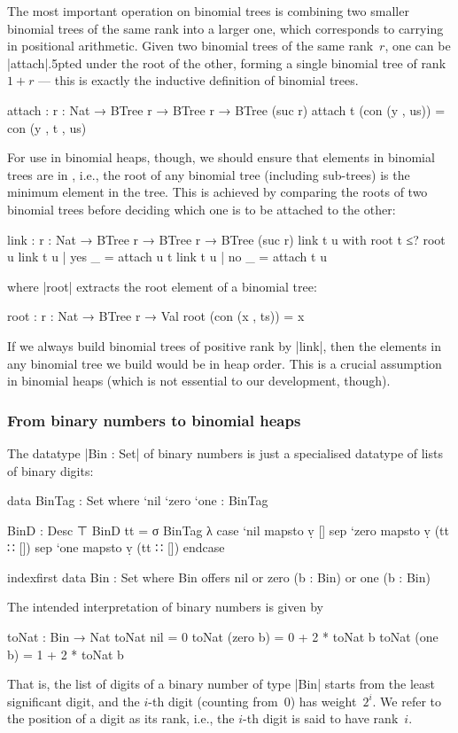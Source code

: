 The most important operation on binomial trees is combining two smaller binomial trees of the same rank into a larger one, which corresponds to carrying in positional arithmetic.
Given two binomial trees of the same rank~$r$, one can be |attach|{\kern.5pt}ed under the root of the other, forming a single binomial tree of rank $1+r$ --- this is exactly the inductive definition of binomial trees.
\begin{code}
attach : {r : Nat} → BTree r → BTree r → BTree (suc r)
attach t (con (y , us)) = con (y , t , us)
\end{code}
For use in binomial heaps, though, we should ensure that elements in binomial trees are in , i.e., the root of any binomial tree (including sub-trees) is the minimum element in the tree.
This is achieved by comparing the roots of two binomial trees before deciding which one is to be attached to the other:
\begin{code}
link : {r : Nat} → BTree r → BTree r → BTree (suc r)
link t u with root t ≤? root u
link t u | yes  _ = attach u t
link t u | no   _ = attach t u
\end{code}
where |root| extracts the root element of a binomial tree:
\begin{code}
root : {r : Nat} → BTree r → Val
root (con (x , ts)) = x
\end{code}
If we always build binomial trees of positive rank by |link|, then the elements in any binomial tree we build would be in heap order.
This is a crucial assumption in binomial heaps (which is not essential to our development, though).

\subsubsection{From binary numbers to binomial heaps}
The datatype |Bin : Set| of binary numbers is just a specialised datatype of lists of binary digits:
\begin{code}
data BinTag : Set where `nil `zero `one : BinTag

BinD : Desc ⊤
BinD tt = σ BinTag λ  case  `nil   mapsto  ṿ []
                      sep   `zero  mapsto  ṿ (tt ∷ [])
                      sep   `one   mapsto  ṿ (tt ∷ []) endcase

indexfirst data Bin : Set where
  Bin  offers  nil
       or      zero  (b : Bin)
       or      one   (b : Bin)
\end{code}
The intended interpretation of binary numbers is given by
\begin{code}
toNat : Bin → Nat
toNat nil        = 0
toNat (zero  b)  = 0 + 2 * toNat b
toNat (one   b)  = 1 + 2 * toNat b
\end{code}
That is, the list of digits of a binary number of type |Bin| starts from the least significant digit, and the $i$-th digit (counting from~$0$) has weight~$2^i$.
We refer to the position of a digit as its rank, i.e., the $i$-th digit is said to have rank~$i$.

